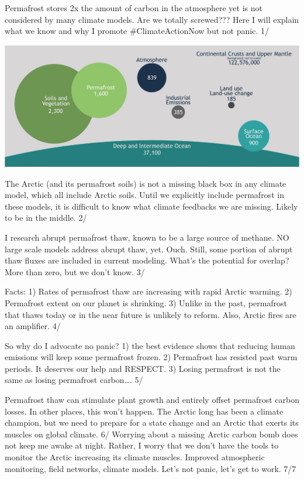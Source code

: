 \documentclass[
]{book}
\begin{document}
Permafrost stores 2x the amount of carbon in the atmosphere yet is not considered by many climate models. Are we totally screwed??? Here I will explain what we know and why I promote \#ClimateActionNow but not panic. 1/

\includegraphics{fig/permafrost_storage.jpg}

The Arctic (and its permafrost soils) is not a missing black box in any climate model, which all include Arctic soils. Until we explicitly include permafrost in these models, it is difficult to know what climate feedbacks we are missing. Likely to be in the middle. 2/

I research abrupt permafrost thaw, known to be a large source of methane. NO large scale models address abrupt thaw, yet. Ouch. Still, some portion of abrupt thaw fluxes are included in current modeling. What's the potential for overlap? More than zero, but we don't know. 3/

Facts: 1) Rates of permafrost thaw are increasing with rapid Arctic warming. 2) Permafrost extent on our planet is shrinking. 3) Unlike in the past, permafrost that thaws today or in the near future is unlikely to reform. Also, Arctic fires are an amplifier. 4/

So why do I advocate no panic?
1) the best evidence shows that reducing human emissions will keep some permafrost frozen.
2) Permafrost has resisted past warm periods. It deserves our help and RESPECT.
3) Losing permafrost is not the same as losing permafrost carbon\ldots. 5/

Permafrost thaw can stimulate plant growth and entirely offset permafrost carbon losses. In other places, this won't happen. The Arctic long has been a climate champion, but we need to prepare for a state change and an Arctic that exerts its muscles on global climate. 6/
Worrying about a missing Arctic carbon bomb does not keep me awake at night. Rather, I worry that we don't have the tools to monitor the Arctic increasing its climate muscles. Improved atmospheric monitoring, field networks, climate models. Let's not panic, let's get to work. 7/7
\end{document}
